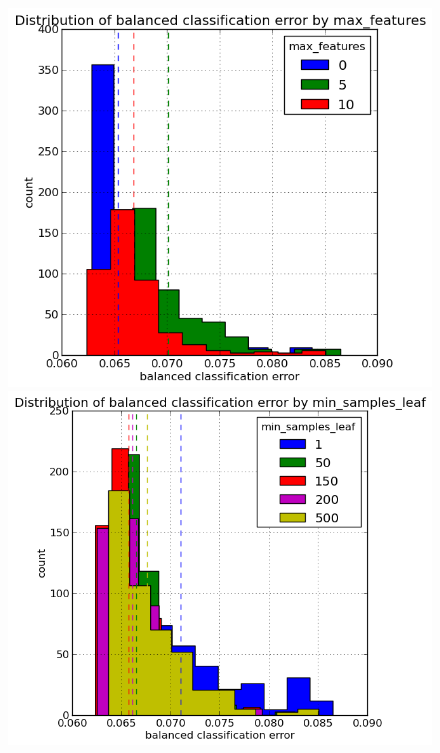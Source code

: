 \documentclass[final,3p,times,twocolumn]{elsarticle}
\begin{document}
\begin{figure}
\includegraphics[scale=0.5]{Images/balanced_classification_error_max_features.png}
\includegraphics[scale=0.5]{Images/balanced_classification_error_min_samples_leaf.png}

\end{figure}
\end{document}
